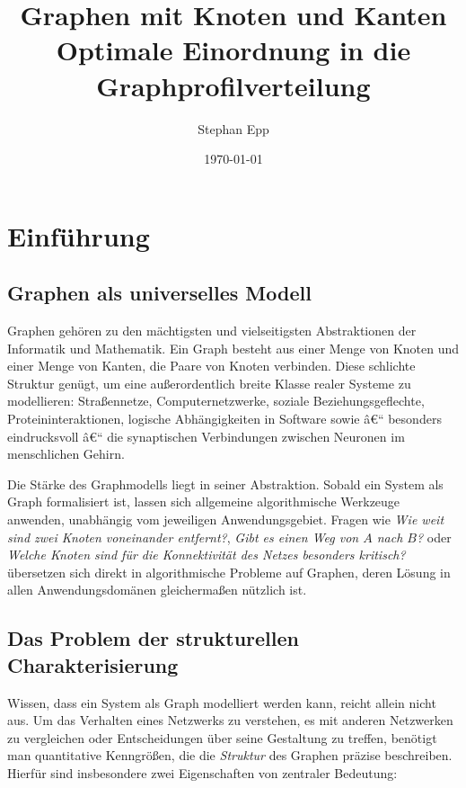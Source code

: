 ﻿\documentclass[a4paper,12pt]{article}
\title{Graphen mit Knoten und Kanten \\[0.5ex]\large Optimale Einordnung in die Graphprofilverteilung}
\author{Stephan Epp}
\date{\today}
\theoremstyle{definition}
\begin{document}
	
	\maketitle
	
	\tableofcontents
	\newpage
	
	\section{Einführung}

	\subsection{Graphen als universelles Modell}

	Graphen gehören zu den mächtigsten und vielseitigsten Abstraktionen der Informatik und Mathematik. Ein Graph besteht aus einer Menge von Knoten und einer Menge von Kanten, die Paare von Knoten verbinden. Diese schlichte Struktur genügt, um eine außerordentlich breite Klasse realer Systeme zu modellieren: Straßennetze, Computernetzwerke, soziale Beziehungsgeflechte, Proteininteraktionen, logische Abhängigkeiten in Software sowie â€“ besonders eindrucksvoll â€“ die synaptischen Verbindungen zwischen Neuronen im menschlichen Gehirn.

	Die Stärke des Graphmodells liegt in seiner Abstraktion. Sobald ein System als Graph formalisiert ist, lassen sich allgemeine algorithmische Werkzeuge anwenden, unabhängig vom jeweiligen Anwendungsgebiet. Fragen wie \emph{Wie weit sind zwei Knoten voneinander entfernt?}, \emph{Gibt es einen Weg von $A$ nach $B$?} oder \emph{Welche Knoten sind für die Konnektivität des Netzes besonders kritisch?} übersetzen sich direkt in algorithmische Probleme auf Graphen, deren Lösung in allen Anwendungsdomänen gleichermaßen nützlich ist.

	\subsection{Das Problem der strukturellen Charakterisierung}

	Wissen, dass ein System als Graph modelliert werden kann, reicht allein nicht aus. Um das Verhalten eines Netzwerks zu verstehen, es mit anderen Netzwerken zu vergleichen oder Entscheidungen über seine Gestaltung zu treffen, benötigt man quantitative Kenngrößen, die die \emph{Struktur} des Graphen präzise beschreiben. Hierfür sind insbesondere zwei Eigenschaften von zentraler Bedeutung:
\end{document}
